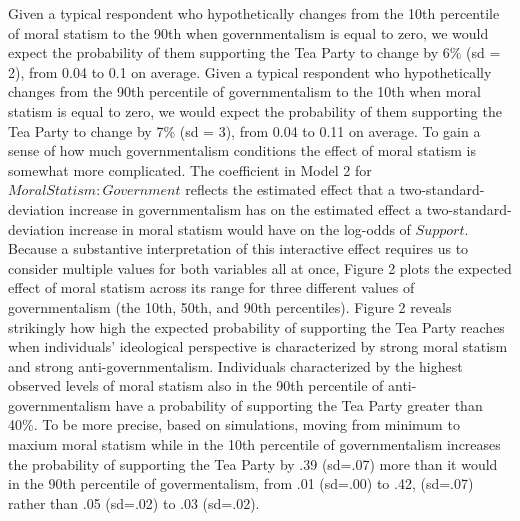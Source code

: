 \documentclass[12pt,]{article}
\begin{document}
Given a typical respondent who hypothetically changes from the 10th
percentile of moral statism to the 90th when governmentalism is equal to
zero, we would expect the probability of them supporting the Tea Party
to change by 6\% (sd = 2), from 0.04 to 0.1 on average. Given a typical
respondent who hypothetically changes from the 90th percentile of
governmentalism to the 10th when moral statism is equal to zero, we
would expect the probability of them supporting the Tea Party to change
by 7\% (sd = 3), from 0.04 to 0.11 on average. To gain a sense of how
much governmentalism conditions the effect of moral statism is somewhat
more complicated. The coefficient in Model 2 for
\(MoralStatism:Government\) reflects the estimated effect that a
two-standard-deviation increase in governmentalism has on the estimated
effect a two-standard-deviation increase in moral statism would have on
the log-odds of \(Support\). Because a substantive interpretation of
this interactive effect requires us to consider multiple values for both
variables all at once, Figure 2 plots the expected effect of moral
statism across its range for three different values of governmentalism
(the 10th, 50th, and 90th percentiles). Figure 2 reveals strikingly how
high the expected probability of supporting the Tea Party reaches when
individuals' ideological perspective is characterized by strong moral
statism and strong anti-governmentalism. Individuals characterized by
the highest observed levels of moral statism also in the 90th percentile
of anti-governmentalism have a probability of supporting the Tea Party
greater than 40\%. To be more precise, based on simulations, moving from
minimum to maxium moral statism while in the 10th percentile of
governmentalism increases the probability of supporting the Tea Party by
.39 (sd=.07) more than it would in the 90th percentile of
govermentalism, from .01 (sd=.00) to .42, (sd=.07) rather than .05
(sd=.02) to .03 (sd=.02).
\end{document}
